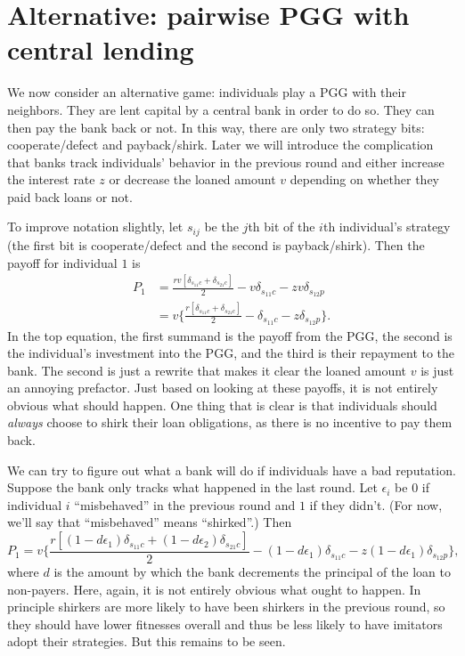 \documentclass[14pt, a4paper, justified]{article}
\begin{document}
\section*{Alternative: pairwise PGG with central lending}

We now consider an alternative game: individuals play a PGG with their neighbors.
They are lent capital by a central bank in order to do so.
They can then pay the bank back or not.
In this way, there are only two strategy bits: cooperate/defect and payback/shirk.
Later we will introduce the complication that banks track individuals' behavior in the previous round and either increase the interest rate $z$ or decrease the loaned amount $v$ depending on whether they paid back loans or not.

To improve notation slightly, let $s_{ij}$ be the $j$th bit of the $i$th individual's strategy (the first bit is cooperate/defect and the second is payback/shirk).
Then the payoff for individual $1$ is
\begin{equation}
    \begin{split}
    P_1 & = \frac{r v [ \delta_{s_{11} c} + \delta_{s_{21} c} ] }{2} - v\delta_{s_{11} c} - zv \delta_{s_{12} p}
    \\
    & = v \Big\{ \frac{r [\delta_{s_{11} c} + \delta_{s_{21} c} ] }{2} - \delta_{s_{11} c} - z \delta_{s_{12} p} \Big\}.
    \end{split}
\end{equation}
In the top equation, the first summand is the payoff from the PGG, the second is the individual's investment into the PGG, and the third is their repayment to the bank.
The second is just a rewrite that makes it clear the loaned amount $v$ is just an annoying prefactor.
Just based on looking at these payoffs, it is not entirely obvious what should happen.
One thing that is clear is that individuals should \emph{always} choose to shirk their loan obligations, as there is no incentive to pay them back.

We can try to figure out what a bank will do if individuals have a bad reputation.
Suppose the bank only tracks what happened in the last round.
Let $\epsilon_i$ be $0$ if individual $i$ ``misbehaved'' in the previous round and $1$ if they didn't.
(For now, we'll say that ``misbehaved'' means ``shirked''.)
Then
\begin{equation}
    P_1 = v \Big\{ \frac{r [ (1-d\epsilon_1) \delta_{s_{11} c} + (1-d\epsilon_2) \delta_{s_{21} c} ] }{2} - (1-d\epsilon_1) \delta_{s_{11} c} - z (1-d\epsilon_1) \delta_{s_{12} p} \Big\},
\end{equation}
where $d$ is the amount by which the bank decrements the principal of the loan to non-payers.
Here, again, it is not entirely obvious what ought to happen.
In principle shirkers are more likely to have been shirkers in the previous round, so they should have lower fitnesses overall and thus be less likely to have imitators adopt their strategies.
But this remains to be seen.
\end{document}
